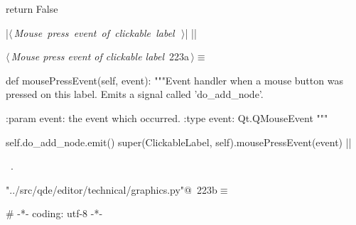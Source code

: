 \documentclass[%
    a4paper,    %
    justified,  %
    nobib,      %
    openany     %
]{tufte-book}
\makeatletter
\renewcommand{\label}[1]{\@tufte@label{##1}}%
\makeatother
\begin{document}
\begin{fullwidth}
\begin{flushleft}
\begin{minipage}{\linewidth}
\begin{pythoncode}
        return False

    |\hbox{$\langle\,${\itshape Mouse press event of clickable label}\nobreak\ {\footnotesize {}}$\,\rangle$}|
|\NWsep|
\end{pythoncode}
\vspace{1.5ex}
\footnotesize
\begin{list}{}{\setlength{\itemsep}{-\parsep}\setlength{\itemindent}{-\leftmargin}}

\item{}
\end{list}
\end{minipage}\vspace{4ex}
\end{flushleft}
\begin{flushleft} \small
\begin{minipage}{\linewidth}\label{scrap228}\raggedright\small
{} $\langle\,${\itshape Mouse press event of clickable label}\nobreak\ {\footnotesize {223a}}$\,\rangle\equiv$
\vspace{-1ex}
\begin{pythoncode}
    def mousePressEvent(self, event):
        """Event handler when a mouse button was pressed on this label. Emits a
        signal called 'do_add_node'.

        :param event: the event which occurred.
        :type event: Qt.QMouseEvent
        """

        self.do_add_node.emit()
        super(ClickableLabel, self).mousePressEvent(event)
|\NWsep|
\end{pythoncode}
\vspace{1.5ex}
\footnotesize
\begin{list}{}{\setlength{\itemsep}{-\parsep}\setlength{\itemindent}{-\leftmargin}}
\item \NWtxtMacroRefIn\ .

\item{}
\end{list}
\end{minipage}\vspace{4ex}
\end{flushleft}

\begin{flushleft} \small
\begin{minipage}{\linewidth}\label{scrap229}\raggedright\small
{} \verb@"../src/qde/editor/technical/graphics.py"@\nobreak\ {\footnotesize {223b}}$\equiv$
\vspace{-1ex}
\begin{pythoncode}
# -*- coding: utf-8 -*-


\end{pythoncode}
\end{minipage}
\end{flushleft}
\end{fullwidth}
\end{document}
